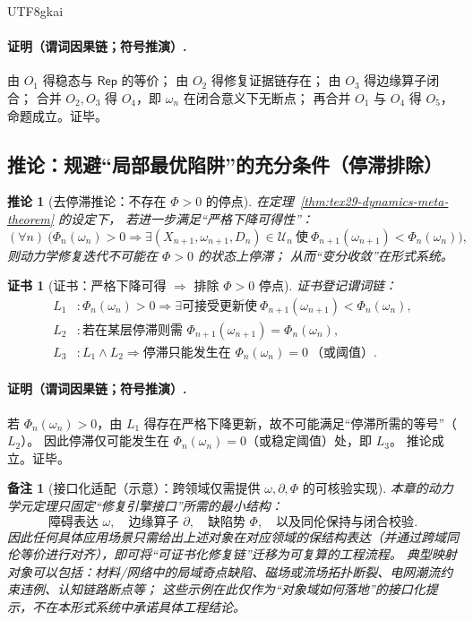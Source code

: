 \documentclass[12pt]{article}
\newtheorem{corollary}{推论}[section]
\newtheorem{remark}{备注}[section]
\newtheorem{Certificate}{证书}[section]
\newcommand{\KouJing}{\texorpdfstring{表述约定}{表述约定}}
\begin{document}
\begin{CJK*}{UTF8}{gkai}
\paragraph{证明（谓词因果链；符号推演）.}
由 $O_1$ 得稳态与 $\mathsf{Rep}$ 的等价；
由 $O_2$ 得修复证据链存在；
由 $O_3$ 得边缘算子闭合；
合并 $O_2,O_3$ 得 $O_4$，即 $\omega_n$ 在闭合意义下无断点；
再合并 $O_1$ 与 $O_4$ 得 $O_5$，命题成立。证毕。

\subsection{推论：规避“局部最优陷阱”的充分条件（停滞排除）}
\label{subsec:tex29-dynamics-meta-no-local-min}

\begin{corollary}[去停滞推论：不存在 $\Phi>0$ 的停点]
\label{cor:tex29-dynamics-meta-no-local-min}
在定理~\ref{thm:tex29-dynamics-meta-theorem} 的设定下，
若进一步满足“严格下降可得性”：
\[
  (\forall n)\ \bigl(\Phi_n(\omega_n)>0\Rightarrow \exists (X_{n+1},\omega_{n+1},D_n)\in\mathcal{U}_n\ \text{使}\
    \Phi_{n+1}(\omega_{n+1})<\Phi_n(\omega_n)\bigr),
\]
则动力学修复迭代不可能在 $\Phi>0$ 的状态上停滞；
从而“变分收敛”在形式系统。
\end{corollary}

\begin{Certificate}[证书：严格下降可得 $\Rightarrow$ 排除 $\Phi>0$ 停点]
\label{cert:tex29-dynamics-meta-no-local-min}
证书登记谓词链：
\[
\begin{aligned}
  L_1 &: \Phi_n(\omega_n)>0\Rightarrow \exists \text{可接受更新使}\ \Phi_{n+1}(\omega_{n+1})<\Phi_n(\omega_n),\\
  L_2 &: \text{若在某层停滞则需 }\Phi_{n+1}(\omega_{n+1})=\Phi_n(\omega_n),\\
  L_3 &: L_1\wedge L_2\Rightarrow \text{停滞只能发生在 }\Phi_n(\omega_n)=0\ \text{（或阈值）}.
\end{aligned}
\]
\end{Certificate}

\paragraph{证明（谓词因果链；符号推演）.}
若 $\Phi_n(\omega_n)>0$，由 $L_1$ 得存在严格下降更新，故不可能满足“停滞所需的等号”（$L_2$）。
因此停滞仅可能发生在 $\Phi_n(\omega_n)=0$（或稳定阈值）处，即 $L_3$。
推论成立。证毕。

\begin{remark}[接口化适配（示意）：跨领域仅需提供 $\omega,\partial,\Phi$ 的可核验实现]
本章的动力学元定理只固定“修复引擎接口”所需的最小结构：
\[
  \text{障碍表达 }\omega,\quad \text{边缘算子 }\partial,\quad \text{缺陷势 }\Phi,\quad \text{以及同伦保持与闭合校验}.
\]
因此任何具体应用场景只需给出上述对象在对应领域的保结构表达（并通过跨域同伦等价进行对齐），即可将“可证书化修复链”迁移为可复算的工程流程。
典型映射对象可以包括：材料/网络中的局域奇点缺陷、磁场或流场拓扑断裂、电网潮流约束违例、认知链路断点等；
这些示例在此仅作为“对象域如何落地”的接口化提示，不在本形式系统中承诺具体工程结论。
\end{remark}


\end{CJK*}
\end{document}

